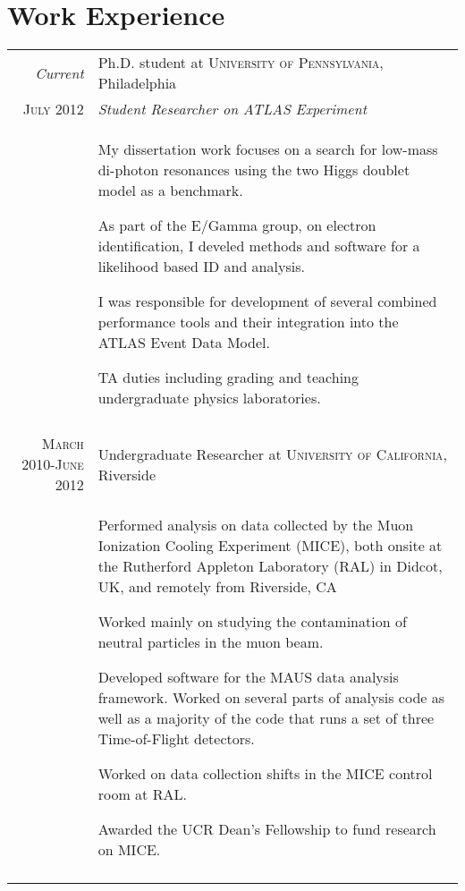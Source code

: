\documentclass[a4paper,10pt]{article} %
\begin{document}

\section{Work Experience}

\begin{tabular}{r|p{11cm}}
\emph{Current}    & Ph.D. student at \textsc{University of Pennsylvania}, Philadelphia \\
\textsc{July 2012} & \emph{Student Researcher on ATLAS Experiment}\\
				   & \begin{itemize}
					 \footnotesize{
						\item My dissertation work focuses on a search for low-mass di-photon resonances using the two Higgs doublet model as a benchmark.
						\item As part of the E/Gamma group, on electron identification, I develed methods and software for a likelihood based ID and analysis.
						\item I was responsible for development of several combined performance tools and their integration into the ATLAS Event Data Model.
						\item TA duties including grading and teaching undergraduate physics laboratories.
					 }
					 \end{itemize} \\
\multicolumn{2}{c}{} \\


\textsc{March 2010-June 2012} & Undergraduate Researcher at \textsc{University of California}, Riverside \emph{}\\
				  & \begin{itemize}
					\footnotesize{
						\item Performed analysis on data collected by the Muon Ionization Cooling Experiment (MICE), both onsite at the Rutherford Appleton Laboratory (RAL) in Didcot, UK, and remotely from Riverside, CA
						\item Worked mainly on studying the contamination of neutral particles in the muon beam.
					    \item Developed software for the MAUS data analysis framework.  Worked on several parts of analysis code as well as a majority of the code that runs a set of three Time-of-Flight detectors.
						\item Worked on data collection shifts in the MICE control room at RAL.
						\item Awarded the UCR Dean’s Fellowship to fund research on MICE.
					}
			        \end{itemize} \\
\multicolumn{2}{c}{} \\


\end{tabular}
\end{document}
